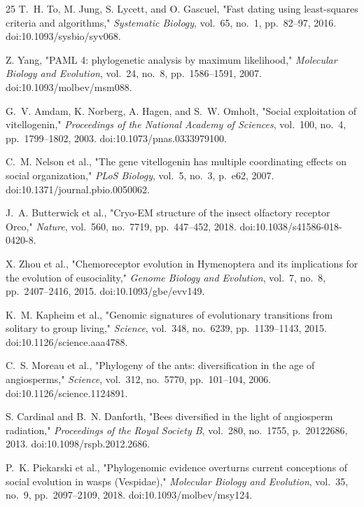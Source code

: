 \documentclass[10pt,letterpaper]{article}
\begin{document}
\begin{thebibliography}{25}
T.~H. To, M. Jung, S. Lycett, and O. Gascuel, "Fast dating using least-squares criteria and algorithms," \emph{Systematic Biology}, vol.~65, no.~1, pp.~82--97, 2016. doi:10.1093/sysbio/syv068.

Z. Yang, "PAML 4: phylogenetic analysis by maximum likelihood," \emph{Molecular Biology and Evolution}, vol.~24, no.~8, pp.~1586--1591, 2007. doi:10.1093/molbev/msm088.

G.~V. Amdam, K. Norberg, A. Hagen, and S.~W. Omholt, "Social exploitation of vitellogenin," \emph{Proceedings of the National Academy of Sciences}, vol.~100, no.~4, pp.~1799--1802, 2003. doi:10.1073/pnas.0333979100.

C.~M. Nelson et al., "The gene vitellogenin has multiple coordinating effects on social organization," \emph{PLoS Biology}, vol.~5, no.~3, p.~e62, 2007. doi:10.1371/journal.pbio.0050062.

J.~A. Butterwick et al., "Cryo-EM structure of the insect olfactory receptor Orco," \emph{Nature}, vol.~560, no.~7719, pp.~447--452, 2018. doi:10.1038/s41586-018-0420-8.

X. Zhou et al., "Chemoreceptor evolution in Hymenoptera and its implications for the evolution of eusociality," \emph{Genome Biology and Evolution}, vol.~7, no.~8, pp.~2407--2416, 2015. doi:10.1093/gbe/evv149.

K.~M. Kapheim et al., "Genomic signatures of evolutionary transitions from solitary to group living," \emph{Science}, vol.~348, no.~6239, pp.~1139--1143, 2015. doi:10.1126/science.aaa4788.

C.~S. Moreau et al., "Phylogeny of the ants: diversification in the age of angiosperms," \emph{Science}, vol.~312, no.~5770, pp.~101--104, 2006. doi:10.1126/science.1124891.

S. Cardinal and B.~N. Danforth, "Bees diversified in the light of angiosperm radiation," \emph{Proceedings of the Royal Society B}, vol.~280, no.~1755, p.~20122686, 2013. doi:10.1098/rspb.2012.2686.

P.~K. Piekarski et al., "Phylogenomic evidence overturns current conceptions of social evolution in wasps (Vespidae)," \emph{Molecular Biology and Evolution}, vol.~35, no.~9, pp.~2097--2109, 2018. doi:10.1093/molbev/msy124.


\end{thebibliography}
\end{document}
